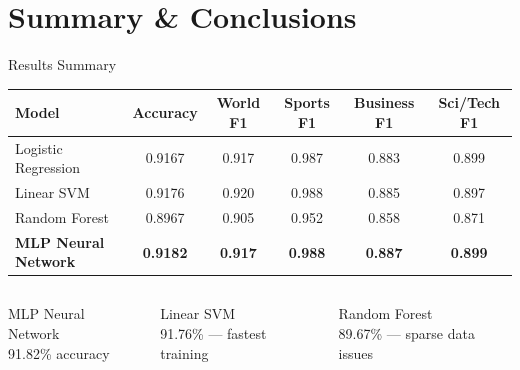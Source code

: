 \documentclass[aspectratio=169,11pt]{beamer}
\begin{document}
\section{Summary \& Conclusions}

\begin{frame}{Results Summary}
\begin{center}
\begin{tcolorbox}[colback=light,colframe=primary,title=\textbf{Final Model Comparison --- AG News Test Set (7,600 articles)},fonttitle=\normalsize\bfseries,width=\textwidth]
  \centering\small
  \setlength{\tabcolsep}{6pt}
  \begin{tabular}{lccccc}
    \toprule
    \textbf{Model} & \textbf{Accuracy} & \textbf{World F1} & \textbf{Sports F1} & \textbf{Business F1} & \textbf{Sci/Tech F1}\\
    \midrule
    \rowcolor{worldcol!20}
    Logistic Regression & 0.9167 & 0.917 & 0.987 & 0.883 & 0.899\\
    \rowcolor{sportscol!20}
    Linear SVM          & 0.9176 & 0.920 & 0.988 & 0.885 & 0.897\\
    \rowcolor{businesscol!20}
    Random Forest       & 0.8967 & 0.905 & 0.952 & 0.858 & 0.871\\
    \rowcolor{scitechcol!30}
    \textbf{MLP Neural Network} & \textbf{0.9182} & \textbf{0.917} & \textbf{0.988} & \textbf{0.887} & \textbf{0.899}\\
    \bottomrule
  \end{tabular}
\end{tcolorbox}
\end{center}
\vspace{4pt}
\begin{columns}
    \begin{tcolorbox}[colback=scitechcol!15,colframe=scitechcol,fonttitle=\footnotesize\bfseries,title=Best Overall]
      \centering\small MLP Neural Network\\91.82\% accuracy
    \end{tcolorbox}
    \begin{tcolorbox}[colback=sportscol!15,colframe=sportscol,fonttitle=\footnotesize\bfseries,title=Best Efficiency]
      \centering\small Linear SVM\\91.76\% --- fastest training
    \end{tcolorbox}
    \begin{tcolorbox}[colback=businesscol!15,colframe=businesscol,fonttitle=\footnotesize\bfseries,title=Weakest]
      \centering\small Random Forest\\89.67\% --- sparse data issues
    \end{tcolorbox}
\end{columns}
\end{frame}
\end{document}
